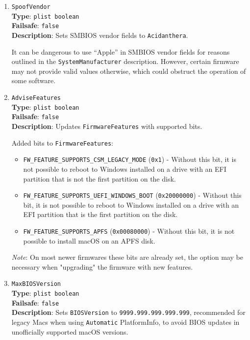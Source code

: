 \documentclass[]{article}
\begin{document}
\begin{enumerate}
\item
  \texttt{SpoofVendor}\\
  \textbf{Type}: \texttt{plist\ boolean}\\
  \textbf{Failsafe}: \texttt{false}\\
  \textbf{Description}: Sets SMBIOS vendor fields to \texttt{Acidanthera}.

  It can be dangerous to use ``Apple'' in SMBIOS vendor fields for reasons outlined in the
  \texttt{SystemManufacturer} description. However, certain firmware may not provide
  valid values otherwise, which could obstruct the operation of some software.

\item
  \texttt{AdviseFeatures}\\
  \textbf{Type}: \texttt{plist\ boolean}\\
  \textbf{Failsafe}: \texttt{false}\\
  \textbf{Description}: Updates \texttt{FirmwareFeatures} with supported bits.

  Added bits to \texttt{FirmwareFeatures}:

  \begin{itemize}
    \item \texttt{FW\_FEATURE\_SUPPORTS\_CSM\_LEGACY\_MODE} (\texttt{0x1})
    - Without this bit, it is not possible to reboot to Windows installed on
      a drive with an EFI partition that is not the first partition on the disk.
    \item \texttt{FW\_FEATURE\_SUPPORTS\_UEFI\_WINDOWS\_BOOT} (\texttt{0x20000000})
    - Without this bit, it is not possible to reboot to Windows installed on
      a drive with an EFI partition that is the first partition on the disk.
    \item \texttt{FW\_FEATURE\_SUPPORTS\_APFS} (\texttt{0x00080000})
    - Without this bit, it is not possible to install macOS on an APFS disk.
  \end{itemize}

  \emph{Note}: On most newer firmwares these bits are already set, the option
  may be necessary when "upgrading" the firmware with new features.

\item
  \texttt{MaxBIOSVersion}\\
  \textbf{Type}: \texttt{plist\ boolean}\\
  \textbf{Failsafe}: \texttt{false}\\
  \textbf{Description}: Sets \texttt{BIOSVersion} to \texttt{9999.999.999.999.999}, recommended for legacy
  Macs when using \texttt{Automatic} PlatformInfo, to avoid BIOS updates in unofficially supported macOS
  versions.


\end{enumerate}
\end{document}
